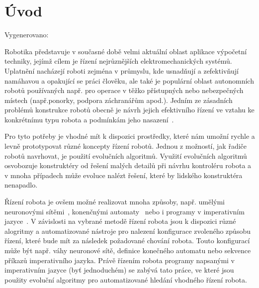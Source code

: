 \chapter{Úvod}
Vygenerovano: \DTMnow








Robotika představuje v současné době velmi aktuální oblast aplikace výpočetní techniky, jejímž cílem je řízení nejrůznějších
elektromechanických systémů.
Uplatnění nacházejí roboti zejména v průmyslu, kde usnadňují a zefektivňují namáhavou a
opakující se práci člověku, ale také je populární oblast autonomních robotů používaných např. pro operace v těžko přístupných
nebo nebezpečných místech (např.ponorky, podpora záchranářům apod.).
Jedním ze zásadních problémů konstrukce robotů obecně je návrh jejich efektivního řízení ve vztahu ke konkrétnímu typu robota a podmínkám jeho nasazení~\cite{Bongard2013}.

Pro tyto potřeby je vhodné mít k dispozici prostředky, které nám umožní rychle a levně prototypovat různé koncepty řízení
robotů.
Jednou z možností, jak řadiče robotů navrhovat, je použití evolučních algoritmů.
Využití evolučních algoritmů osvobozuje konstruktéry od řešení malých detailů při návrhu kontroléru robota a v mnoha případech může evoluce nalézt řešení, které by lidského konstruktéra nenapadlo.

Řízení robota je ovšem možné realizovat mnoha způsoby, např. umělými neuronovými sítěmi~\cite{Reil2002}, konenčnými automaty~\cite{Hodgins1996} nebo i programy v imperativním jazyce~\cite{Wolff2007}.
V závislosti na vybrané metodě řízení robota jsou k dispozici různé alogritmy a automatizované nástroje pro nalezení konfigurace zvoleného způsobu řízení, které bude mít za následek požadované chování robota.
Touto konfigurací může být např. váhy neuronové sítě, definice konečného automatu nebo sekvence příkazů imperativního jazyka.
Právě řízením robota programy napsanými v imperativním jazyce (byť jednoduchém) se zabývá tato práce, ve které jsou použity evoluční algoritmy pro automatizované hledání vhodného řízení robota.

